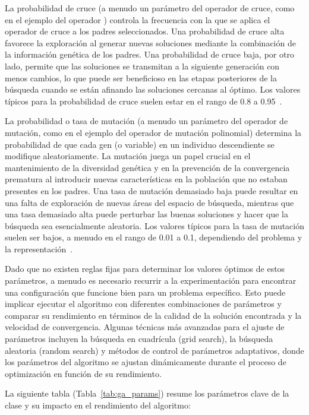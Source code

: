 La probabilidad de cruce (a menudo un parámetro del operador de cruce, como \texttt{} en el ejemplo del operador \texttt{}) controla la frecuencia con la que se aplica el operador de cruce a los padres seleccionados. Una probabilidad de cruce alta favorece la exploración al generar nuevas soluciones mediante la combinación de la información genética de los padres. Una probabilidad de cruce baja, por otro lado, permite que las soluciones se transmitan a la siguiente generación con menos cambios, lo que puede ser beneficioso en las etapas posteriores de la búsqueda cuando se están afinando las soluciones cercanas al óptimo. Los valores típicos para la probabilidad de cruce suelen estar en el rango de 0.8 a 0.95~\cite{eiben2015}.

La probabilidad o tasa de mutación (a menudo un parámetro del operador de mutación, como \texttt{} en el ejemplo del operador de mutación polinomial) determina la probabilidad de que cada gen (o variable) en un individuo descendiente se modifique aleatoriamente. La mutación juega un papel crucial en el mantenimiento de la diversidad genética y en la prevención de la convergencia prematura al introducir nuevas características en la población que no estaban presentes en los padres. Una tasa de mutación demasiado baja puede resultar en una falta de exploración de nuevas áreas del espacio de búsqueda, mientras que una tasa demasiado alta puede perturbar las buenas soluciones y hacer que la búsqueda sea esencialmente aleatoria. Los valores típicos para la tasa de mutación suelen ser bajos, a menudo en el rango de 0.01 a 0.1, dependiendo del problema y la representación~\cite{eiben2015}.

Dado que no existen reglas fijas para determinar los valores óptimos de estos parámetros, a menudo es necesario recurrir a la experimentación para encontrar una configuración que funcione bien para un problema específico. Esto puede implicar ejecutar el algoritmo con diferentes combinaciones de parámetros y comparar su rendimiento en términos de la calidad de la solución encontrada y la velocidad de convergencia. Algunas técnicas más avanzadas para el ajuste de parámetros incluyen la búsqueda en cuadrícula (grid search), la búsqueda aleatoria (random search) y métodos de control de parámetros adaptativos, donde los parámetros del algoritmo se ajustan dinámicamente durante el proceso de optimización en función de su rendimiento.

La siguiente tabla (Tabla~\ref{tab:ga_params}) resume los parámetros clave de la clase \texttt{} y su impacto en el rendimiento del algoritmo:

